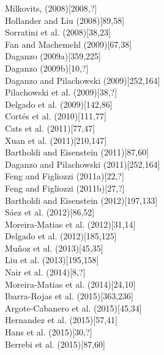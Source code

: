 \documentclass{article}
\begin{document}
\noindent \textrm{Milkovits, (2008)}[2008,?]\\
\noindent \textrm{Hollander and Liu (2008)}[89,58]\\
\noindent \textrm{Sorratini et al. (2008)}[38,23]\\
\noindent \textrm{Fan and Machemehl (2009)}[67,38]\\
\noindent \textrm{Daganzo (2009a)}[359,225]\\ 
\noindent \textrm{Daganzo (2009b)}[10,?]\\
\noindent \textrm{Daganzo and Pilachowski (2009)}[252,164]\\ 
\noindent \textrm{Pilachowski et al. (2009)}[38,?]\\
\noindent \textrm{Delgado et al. (2009)}[142,86]\\
\noindent \textrm{Cortés et al. (2010)}[111,77]\\
\noindent \textrm{Cats et al. (2011)}[77,47]\\
\noindent \textrm{Xuan et al. (2011)}[210,147]\\
\noindent \textrm{Bartholdi and Eisenstein (2011)}[87,60]\\
\noindent \textrm{Daganzo and Pilachowski (2011)}[252,164]\\
\noindent \textrm{Feng and Figliozzi (2011a)}[22,?]\\
\noindent \textrm{Feng and Figliozzi (2011b)}[27,?]\\ 
\noindent \textrm{Bartholdi and Eisenstein (2012)}[197,133]\\
\noindent \textrm{Sáez et al. (2012)}[86,52]\\
\noindent \textrm{Moreira-Matias et al. (2012)}[31,14]\\
\noindent \textrm{Delgado et al. (2012)}[185,125]\\
\noindent \textrm{Muñoz et al. (2013)}[45,35]\\
\noindent \textrm{Liu et al. (2013)}[195,158]\\
\noindent \textrm{Nair et al. (2014)}[8,?]\\
\noindent \textrm{Moreira-Matias et al. (2014)}[24,10]\\
\noindent \textrm{Ibarra-Rojas et al. (2015)}[363,236]\\
\noindent \textrm{Argote-Cabanero et al. (2015)}[45,34]\\
\noindent \textrm{Hernandez et al. (2015)}[57,41]\\
\noindent \textrm{Hans et al. (2015)}[30,?]\\
\noindent \textrm{Berrebi et al. (2015)}[87,60]\\
\end{document}
